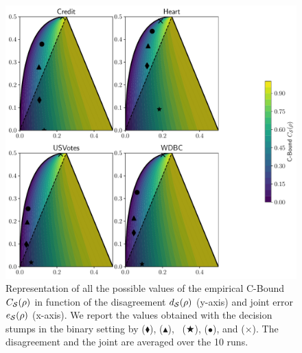 \begin{noaddcontents}
\begin{figure}[H]
    \centering
    \includegraphics[width=1.0\linewidth]{chapter_4/figures/cbound_stump_binary_1.pdf}
    \caption{
    Representation of all the possible values of the empirical C-Bound ${C}_{\mathcal{S}}(\rho)$ in function of the disagreement $d_{\mathcal{S}}(\rho)$ (y-axis) and joint error $e_{\mathcal{S}}(\rho)$ (x-axis).
We report the values obtained with the decision stumps in the binary setting by  ($\blacklozenge$), \algomasegosa ($\blacktriangle$), \algogermain~($\bigstar$), \cbboost ($\bullet$), and \mincq ($\boldsymbol{\times}$).
The disagreement and the joint are averaged over the 10 runs.
    }
    \label{chap:mv:fig:cbound-stump-binary-1}
\end{figure}


\end{noaddcontents}
